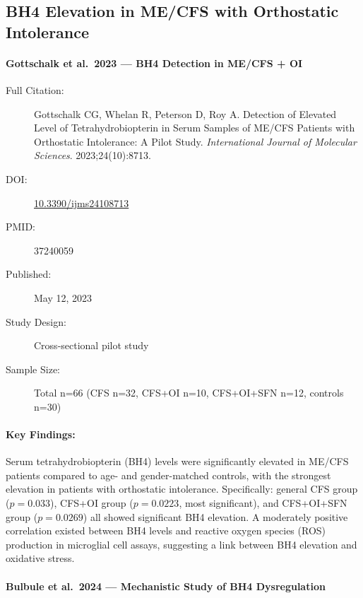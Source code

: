 \subsection{BH4 Elevation in ME/CFS with Orthostatic Intolerance}

\paragraph{Gottschalk et al.\ 2023 --- BH4 Detection in ME/CFS + OI}

\begin{description}
    \item[Full Citation:] Gottschalk CG, Whelan R, Peterson D, Roy A. Detection of Elevated Level of Tetrahydrobiopterin in Serum Samples of ME/CFS Patients with Orthostatic Intolerance: A Pilot Study. \textit{International Journal of Molecular Sciences}. 2023;24(10):8713.
    \item[DOI:] \href{https://doi.org/10.3390/ijms24108713}{10.3390/ijms24108713}
    \item[PMID:] 37240059
    \item[Published:] May 12, 2023
    \item[Study Design:] Cross-sectional pilot study
    \item[Sample Size:] Total n=66 (CFS n=32, CFS+OI n=10, CFS+OI+SFN n=12, controls n=30)
\end{description}

\paragraph{Key Findings:}
Serum tetrahydrobiopterin (BH4) levels were significantly elevated in ME/CFS patients compared to age- and gender-matched controls, with the strongest elevation in patients with orthostatic intolerance. Specifically: general CFS group ($p=0.033$), CFS+OI group ($p=0.0223$, most significant), and CFS+OI+SFN group ($p=0.0269$) all showed significant BH4 elevation. A moderately positive correlation existed between BH4 levels and reactive oxygen species (ROS) production in microglial cell assays, suggesting a link between BH4 elevation and oxidative stress.

\paragraph{Bulbule et al.\ 2024 --- Mechanistic Study of BH4 Dysregulation}

